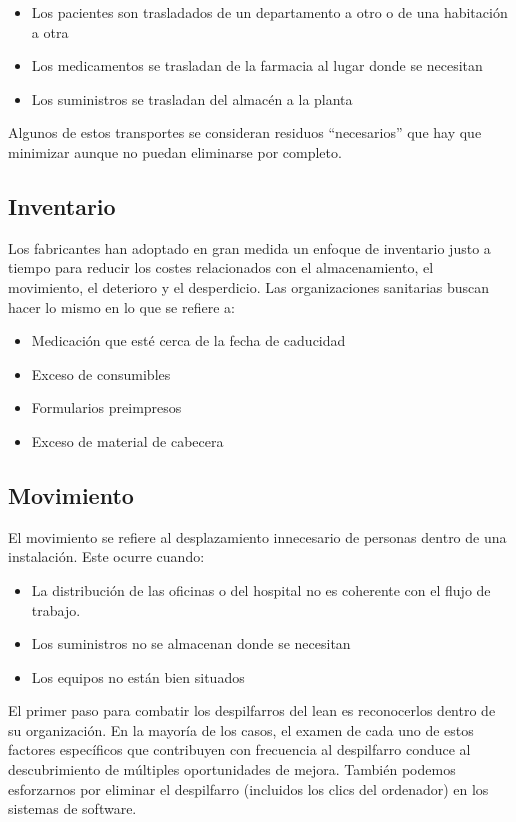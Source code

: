 \begin{itemize}
    \item Los pacientes son trasladados de un departamento a otro o de una habitación a otra
    \item Los medicamentos se trasladan de la farmacia al lugar donde se necesitan
    \item Los suministros se trasladan del almacén a la planta
\end{itemize}

Algunos de estos transportes se consideran residuos ``necesarios'' que hay que minimizar aunque no puedan eliminarse por completo.

\subsection{Inventario}

Los fabricantes han adoptado en gran medida un enfoque de inventario justo a tiempo para reducir los costes relacionados con el almacenamiento, el movimiento, el deterioro y el desperdicio.
Las organizaciones sanitarias buscan hacer lo mismo en lo que se refiere a:

\begin{itemize}
    \item Medicación que esté cerca de la fecha de caducidad
    \item Exceso de consumibles
    \item Formularios preimpresos
    \item Exceso de material de cabecera
\end{itemize}

\subsection{Movimiento}

El movimiento se refiere al desplazamiento innecesario de personas dentro de una instalación.
Este ocurre cuando:

\begin{itemize}
    \item La distribución de las oficinas o del hospital no es coherente con el flujo de trabajo.
    \item Los suministros no se almacenan donde se necesitan
    \item Los equipos no están bien situados
\end{itemize}

El primer paso para combatir los despilfarros del lean es reconocerlos dentro de su organización.
En la mayoría de los casos, el examen de cada uno de estos factores específicos que contribuyen con frecuencia al despilfarro conduce al descubrimiento de múltiples oportunidades de mejora.
También podemos esforzarnos por eliminar el despilfarro (incluidos los clics del ordenador) en los sistemas de software.

